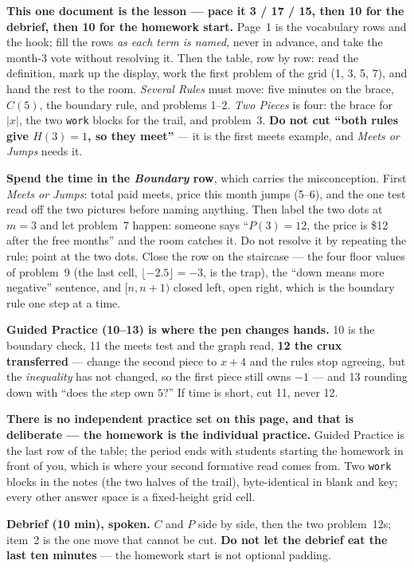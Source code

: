 \documentclass[10pt]{article}
\begin{document}
\begin{teachernote}
\textbf{This one document is the lesson --- pace it 3 / 17 / 15, then 10 for the debrief, then 10
for the homework start.} Page~1 is the vocabulary rows and the hook; fill the rows \emph{as each
term is named}, never in advance, and take the month-3 vote without resolving it. Then the table,
row by row: read the definition, mark up the display, work the first problem of the grid (1, 3,
5, 7), and hand the rest to the room. \emph{Several Rules} must move: five minutes on the brace,
$C(5)$, the boundary rule, and problems 1--2. \emph{Two Pieces} is four: the brace for $|x|$, the
two \texttt{work} blocks for the trail, and problem~3. \textbf{Do not cut ``both rules give
$H(3)=1$, so they meet''} --- it is the first meets example, and \emph{Meets or Jumps} needs it.

\textbf{Spend the time in the \emph{Boundary} row}, which carries the misconception. First
\emph{Meets or Jumps}: total paid meets, price this month jumps (5--6), and the one test read off
the two pictures before naming anything. Then label the two dots at $m=3$ and let problem~7
happen: someone says ``$P(3)=12$, the price is \$12 after the free months'' and the room catches
it. Do not resolve it by repeating the rule; point at the two dots. Close the row on the
staircase --- the four floor values of problem~9 (the last cell, $\lfloor-2.5\rfloor=-3$, is the
trap), the ``down means more negative'' sentence, and $[n,n+1)$ closed left, open right, which is
the boundary rule one step at a time.

\textbf{Guided Practice (10--13) is where the pen changes hands.} 10 is the boundary check, 11
the meets test and the graph read, \textbf{12 the crux transferred} --- change the second piece to
$x+4$ and the rules stop agreeing, but the \emph{inequality} has not changed, so the first piece
still owns $-1$ --- and 13 rounding down with ``does the step own $5$?'' If time is short, cut 11,
never 12.

\textbf{There is no independent practice set on this page, and that is deliberate --- the
homework is the individual practice.} Guided Practice is the last row of the table; the period
ends with students starting the homework in front of you, which is where your second formative
read comes from. Two \texttt{work} blocks in the notes (the two halves of the trail), byte-identical
in blank and key; every other answer space is a fixed-height grid cell.

\textbf{Debrief (10 min), spoken.} $C$ and $P$ side by side, then the two problem~12s; item~2 is
the one move that cannot be cut. \textbf{Do not let the debrief eat the last ten minutes} --- the
homework start is not optional padding.
\end{teachernote}
\end{document}
